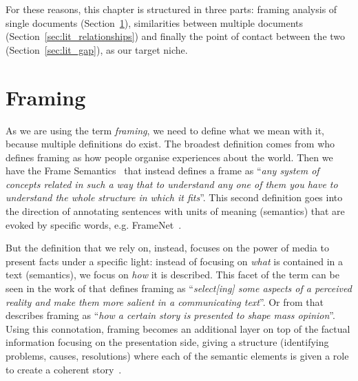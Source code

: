 
For these reasons, this chapter is structured in three parts: framing analysis of single documents (Section~\ref{sec:lit_framing}), similarities between multiple documents (Section~\ref{sec:lit_relationships}) and finally the point of contact between the two (Section~\ref{sec:lit_gap}), as our target niche.


\section{Framing}
\label{sec:lit_framing}

As we are using the term \emph{framing}, we need to define what we mean with it, because multiple definitions do exist.
The broadest definition comes from \citet{goffman1974frame} who defines framing as how people organise experiences about the world.
Then we have the Frame Semantics~\cite{fillmore2006frame} that instead defines a frame as ``\textit{any system of concepts related in such a way that to understand any one of them you have to understand the whole structure in which it fits}''. This second definition goes into the direction of annotating sentences with units of meaning (semantics) that are evoked by specific words, e.g. FrameNet~\cite{baker1998berkeley}.

But the definition that we rely on, instead, focuses on the power of media to present facts under a specific light: instead of focusing on \emph{what} is contained in a text (semantics), we focus on \emph{how} it is described.
This facet of the term can be seen in the work of
\citet{entman1993framing} that defines framing as ``\textit{select[ing] some aspects of a perceived reality and make them more salient in a communicating text}''.
Or from \citet{goffman1974frame} that describes framing as ``\textit{how a certain story is presented to shape mass opinion}''.
Using this connotation, framing becomes an additional layer on top of the factual information focusing on the presentation side, giving a structure (identifying problems, causes, resolutions) where each of the semantic elements is given a role to create a coherent story~\cite{pan1993framing}.

